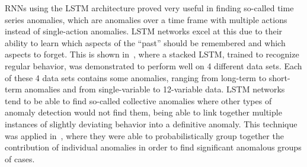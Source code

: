 RNNs using the LSTM architecture proved very useful in finding so-called time series anomalies, which are anomalies over a time frame with multiple actions instead of single-action anomalies. LSTM networks excel at this due to their ability to learn which aspects of the \enquote{past} should be remembered and which aspects to forget. This is shown in~\cite{malhotra2015long}, where a stacked LSTM, trained to recognize regular behavior, was demonstrated to perform well on 4 different data sets. Each of these 4 data sets contains some anomalies, ranging from long-term to short-term anomalies and from single-variable to 12-variable data. LSTM networks tend to be able to find so-called collective anomalies where other types of anomaly detection would not find them, being able to link together multiple instances of slightly deviating behavior into a definitive anomaly. This technique was applied in~\cite{olsson2015probabilistic}, where they were able to probabilistically group together the contribution of individual anomalies in order to find significant anomalous groups of cases.